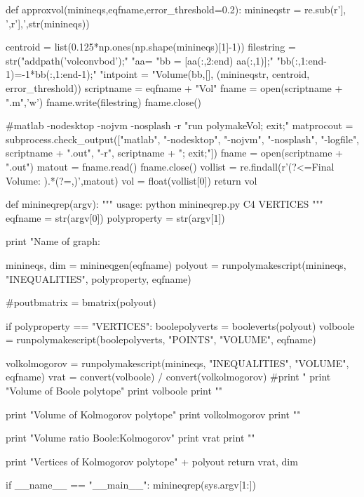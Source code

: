 \begin{python}
def approxvol(minineqs,eqfname,error_threshold=0.2):
    minineqstr = re.sub(r'], ',r'],\n',str(minineqs))

    centroid = list(0.125*np.ones(np.shape(minineqs)[1]-1))
    filestring = str("addpath('volconvbod');\n"
                     "aa=%
                     "bb = [aa(:,2:end) aa(:,1)];\n"
                     "bb(:,1:end-1)=-1*bb(:,1:end-1);\n"
                     "intpoint = %
                     "Volume(bb,[],%
                     (minineqstr, centroid, error_threshold))
    scriptname = eqfname + "Vol"
    fname = open(scriptname + ".m",'w')
    fname.write(filestring)
    fname.close()

    #matlab -nodesktop -nojvm -nosplash -r "run polymakeVol; exit;"
    matprocout = subprocess.check_output(["matlab", "-nodesktop",
                                      "-nojvm", "-nosplash",
                                      "-logfile", scriptname + ".out",
                                      "-r", scriptname + "; exit;"])
    fname = open(scriptname + ".out")
    matout = fname.read()
    fname.close()
    vollist = re.findall(r'(?<=Final Volume: ).*(?=,)',matout)
    vol = float(vollist[0])
    return vol

def minineqrep(argv):
    """
    usage: python minineqrep.py C4 VERTICES
    """
    eqfname = str(argv[0])
    polyproperty = str(argv[1])

    print "Name of graph: \n%

    minineqs, dim = minineqgen(eqfname)
    polyout = runpolymakescript(minineqs, "INEQUALITIES",
                                polyproperty, eqfname)

    #poutbmatrix = bmatrix(polyout)

    if polyproperty == "VERTICES":
        boolepolyverts = booleverts(polyout)
        volboole = runpolymakescript(boolepolyverts,
                            "POINTS", "VOLUME", eqfname)

        volkolmogorov = runpolymakescript(minineqs,
                                        "INEQUALITIES", "VOLUME", eqfname)
        vrat = convert(volboole) / convert(volkolmogorov)
        #print "%
        print "Volume of Boole polytope"
        print volboole
        print ""

        print "Volume of Kolmogorov polytope"
        print volkolmogorov
        print ""

        print "Volume ratio Boole:Kolmogorov"
        print vrat
        print ""

    print "Vertices of Kolmogorov polytope\n" + polyout
    return vrat, dim

if __name__ == "__main__":
    minineqrep(sys.argv[1:])
\end{python}
